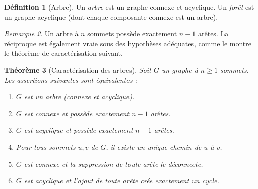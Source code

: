 \documentclass[12pt,a4paper,openany]{book}
\theoremstyle{definition}
\newtheorem{definition}{Définition}[chapter]
\theoremstyle{plain}
\newtheorem{theoreme}[definition]{Théorème}
\theoremstyle{remark}
\newtheorem{remarque}[definition]{Remarque}
\begin{document}
\begin{definition}[Arbre]
\label{def:arbre}
Un \emph{arbre} est un graphe connexe et acyclique. Un \emph{forêt} est
un graphe acyclique (dont chaque composante connexe est un arbre).
\end{definition}

\begin{remarque}
Un arbre à $n$ sommets possède exactement $n-1$ arêtes. La réciproque
est également vraie sous des hypothèses adéquates, comme le montre le
théorème de caractérisation suivant.
\end{remarque}

\begin{theoreme}[Caractérisation des arbres]
\label{thm:caract-arbre}
Soit $G$ un graphe à $n \geq 1$ sommets. Les assertions suivantes sont
équivalentes :
\begin{enumerate}[label=(\roman*)]
  \item $G$ est un arbre (connexe et acyclique).
  \item $G$ est connexe et possède exactement $n-1$ arêtes.
  \item $G$ est acyclique et possède exactement $n-1$ arêtes.
  \item Pour tous sommets $u,v$ de $G$, il existe un unique chemin de $u$
        à $v$.
  \item $G$ est connexe et la suppression de toute arête le déconnecte.
  \item $G$ est acyclique et l'ajout de toute arête crée exactement un
        cycle.
\end{enumerate}
\end{theoreme}
\end{document}
